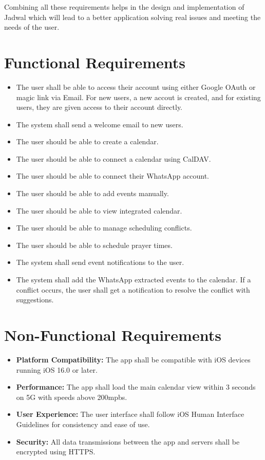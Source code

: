 \documentclass[12pt,a4paper]{report}
\begin{document}
Combining all these requirements helps in the design and implementation of Jadwal which will lead to a better application solving real issues and meeting the needs of the user.


\section{Functional Requirements}

\begin{itemize}
    \item The user shall be able to access their account using either Google OAuth or magic link via Email. For new users, a new accout is created, and for existing users, they are given access to their account directly.
    \item The system shall send a welcome email to new users.
    \item The user should be able to create a calendar.
    \item The user should be able to connect a calendar using CalDAV.
    \item The user should be able to connect their WhatsApp account.
    \item The user should be able to add events manually.
    \item The user should be able to view integrated calendar.
    \item The user should be able to manage scheduling conflicts.
    \item The user should be able to schedule prayer times.
    \item The system shall send event notifications to the user.
    \item The system shall add the WhatsApp extracted events to the calendar. If a conflict occurs, the user shall get a notification to resolve the conflict with suggestions.
\end{itemize}

\newpage

\section{Non-Functional Requirements}

\begin{itemize}
    \item \textbf{Platform Compatibility:} The app shall be compatible with iOS devices running iOS 16.0 or later.
    \item \textbf{Performance:} The app shall load the main calendar view within 3 seconds on 5G with speeds above 200mpbs.
    \item \textbf{User Experience:} The user interface shall follow iOS Human Interface Guidelines for consistency and ease of use.
    \item \textbf{Security:} All data transmissions between the app and servers shall be encrypted using HTTPS.
\end{itemize}
\newpage
\end{document}
